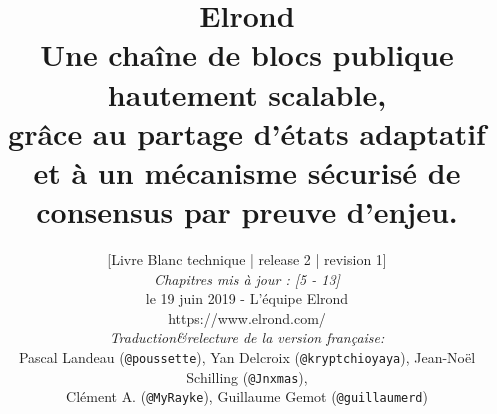 \documentclass[journal]{IEEEtran}
\begin{document}
   \title{$\;$\\
    Elrond \\
    $\;$ \large \\
    {\fontsize{16}{60}\selectfont Une chaîne  de blocs publique hautement scalable,}  \\
    {\fontsize{16}{60}\selectfont grâce au  partage d'états adaptatif}  \\
    {\fontsize{16}{60}\selectfont et à un mécanisme sécurisé de consensus par preuve d'enjeu.} \\
    }


    \author{
    [Livre Blanc technique | release 2 | revision 1] \\
    \textit{Chapitres mis à jour : [5 - 13]}\\
    le 19 juin 2019 - L'équipe Elrond \\
    https://www.elrond.com/ \\
    \vspace{10pt} %
    \textit{Traduction\&relecture de la version française:}   \\ Pascal Landeau (\texttt{@poussette}), Yan Delcroix (\texttt{@kryptchioyaya}), Jean-Noël  Schilling (\texttt{@Jnxmas}),  \\ Clément A. (\texttt{@MyRayke}), Guillaume Gemot (\texttt{@guillaumerd})}

    \maketitle



\maketitle %
\end{document}
